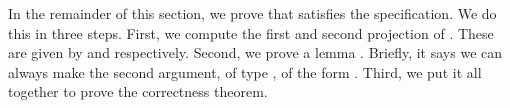 In the remainder of this section, we prove that  satisfies the specification.
We do this in three steps.
First, we compute the first and second projection of .
These are given by  and  respectively.
Second, we prove a lemma .
Briefly, it says we can always make the second argument, of type , of the form  .
Third, we put it all together to prove the correctness theorem.
